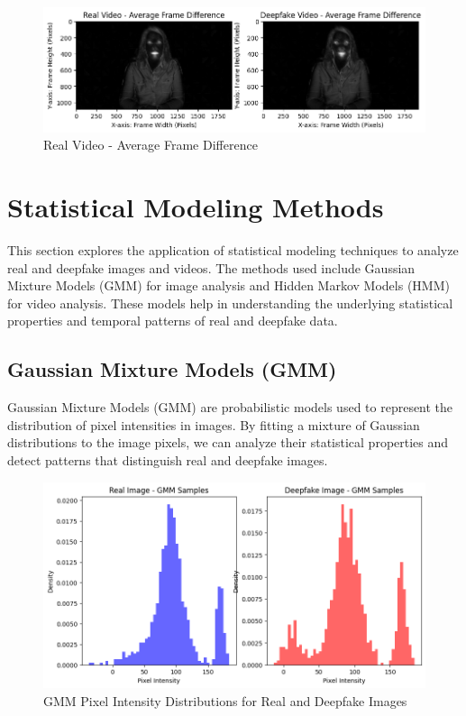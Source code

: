 \documentclass{article}
\begin{document}
\begin{figure}[h!]
    \centering
    \includegraphics[width=1\textwidth]{real_avg_diff.png}
    \caption{Real Video - Average Frame Difference}
    \label{fig:real_avg_diff}
\end{figure}


\section{Statistical Modeling Methods}

This section explores the application of statistical modeling techniques to analyze real and deepfake images and videos. The methods used include Gaussian Mixture Models (GMM) for image analysis and Hidden Markov Models (HMM) for video analysis. These models help in understanding the underlying statistical properties and temporal patterns of real and deepfake data.

\subsection{Gaussian Mixture Models (GMM)}
Gaussian Mixture Models (GMM) are probabilistic models used to represent the distribution of pixel intensities in images. By fitting a mixture of Gaussian distributions to the image pixels, we can analyze their statistical properties and detect patterns that distinguish real and deepfake images.


\begin{figure}[h]
\centering
\includegraphics[width=1\textwidth]{gmm_results.png}
\caption{GMM Pixel Intensity Distributions for Real and Deepfake Images}
\label{fig:gmm_results}
\end{figure}
\end{document}

